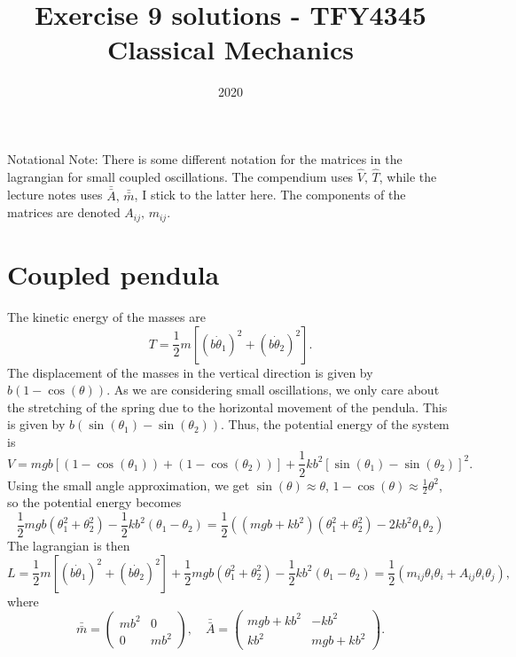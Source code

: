 \documentclass{article}
\title{Exercise 9 solutions - TFY4345 Classical Mechanics}
\date{2020}
\begin{document}
    \maketitle
    Notational Note: There is some different notation for the matrices in the lagrangian for small coupled oscillations. The compendium uses $\hat V, \, \hat T$, while the lecture notes uses $\bar {\bar A}, \, \bar {\bar m}$, I stick to the latter here. The components of the matrices are denoted $A_{ij}, \, m_{ij}$.
    \section{Coupled pendula}
    The kinetic energy of the masses are 
    \begin{equation*}
        T = \frac{1}{2}m\left[(b \dot \theta_1)^2 + (b \dot \theta_2)^2\right].
    \end{equation*}
    The displacement of the masses in the vertical direction is given by $b(1 - \cos(\theta))$. As we are considering small oscillations, we only care about the stretching of the spring due to the horizontal movement of the pendula. This is given by $b (\sin(\theta_1) - \sin(\theta_2))$. Thus, the potential energy of the system is
    \begin{equation*}
        V = mgb\left[(1 - \cos(\theta_1)) + (1 - \cos(\theta_2))\right] + \frac{1}{2}kb^2\left[\sin(\theta_1) - \sin(\theta_2)\right]^2.
    \end{equation*}
    Using the small angle approximation, we get $\sin(\theta) \approx \theta$, $1 - \cos(\theta) \approx \frac{1}{2} \theta^2$, so the potential energy becomes
    \begin{equation*}
        \frac{1}{2} mgb (\theta_1^2 + \theta_2^2) - \frac{1}{2}kb^2(\theta_1 - \theta_2) = \frac{1}{2}\left((mgb + kb^2)(\theta_1^2 + \theta_2^2) - 2kb^2 \theta_1 \theta_2\right)
    \end{equation*}
    The lagrangian is then
    \begin{equation*}
        L = \frac{1}{2}m\left[(b \dot \theta_1)^2 + (b \dot \theta_2)^2\right] + \frac{1}{2} mgb (\theta_1^2 + \theta_2^2) - \frac{1}{2}kb^2(\theta_1 - \theta_2)  = \frac{1}{2}\left(m_{ij}\theta_i \theta_i + A_{ij}\theta_i \theta_j\right),
    \end{equation*}
    where
    \begin{equation*}
        \bar {\bar m} = 
        \begin{pmatrix*}
            mb^2 & 0 \\
            0 & mb^2
        \end{pmatrix*}
        , \quad \bar {\bar A} = 
        \begin{pmatrix}
            mgb + kb^2 & -kb^2 \\
            kb^2 & mgb + kb^2
        \end{pmatrix}.
    \end{equation*}
\end{document}

